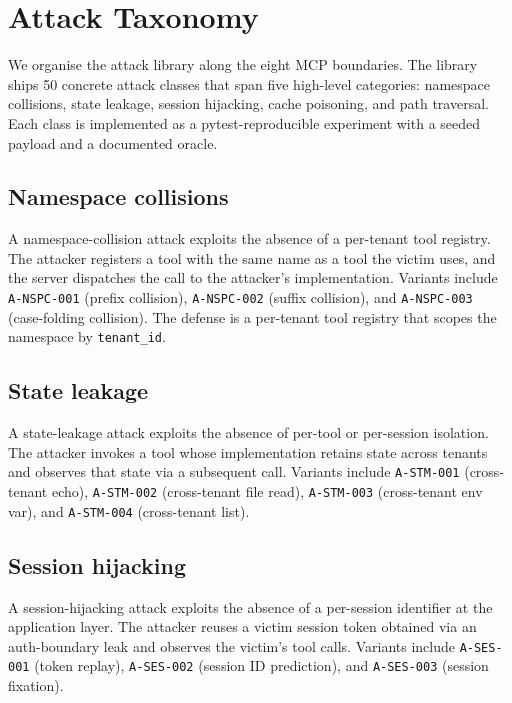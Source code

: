 \documentclass[sigconf, anonymous, natbib=false]{acmart}
\begin{document}
\section{Attack Taxonomy}\label{sec:taxonomy}

We organise the attack library along the eight MCP
boundaries. The library ships 50 concrete attack classes
that span five high-level categories: namespace collisions,
state leakage, session hijacking, cache poisoning, and path
traversal. Each class is implemented as a pytest-reproducible
experiment with a seeded payload and a documented oracle.

\subsection{Namespace collisions}

A namespace-collision attack exploits the absence of a
per-tenant tool registry. The attacker registers a tool
with the same name as a tool the victim uses, and the
server dispatches the call to the attacker's
implementation. Variants include \texttt{A-NSPC-001}
(prefix collision), \texttt{A-NSPC-002} (suffix collision),
and \texttt{A-NSPC-003} (case-folding collision). The
defense is a per-tenant tool registry that scopes the
namespace by \texttt{tenant\_id}.

\subsection{State leakage}

A state-leakage attack exploits the absence of per-tool or
per-session isolation. The attacker invokes a tool whose
implementation retains state across tenants and observes
that state via a subsequent call. Variants include
\texttt{A-STM-001} (cross-tenant echo),
\texttt{A-STM-002} (cross-tenant file read),
\texttt{A-STM-003} (cross-tenant env var), and
\texttt{A-STM-004} (cross-tenant list).

\subsection{Session hijacking}

A session-hijacking attack exploits the absence of a
per-session identifier at the application layer. The
attacker reuses a victim session token obtained via an
auth-boundary leak and observes the victim's tool calls.
Variants include \texttt{A-SES-001} (token replay),
\texttt{A-SES-002} (session ID prediction), and
\texttt{A-SES-003} (session fixation).
\end{document}
